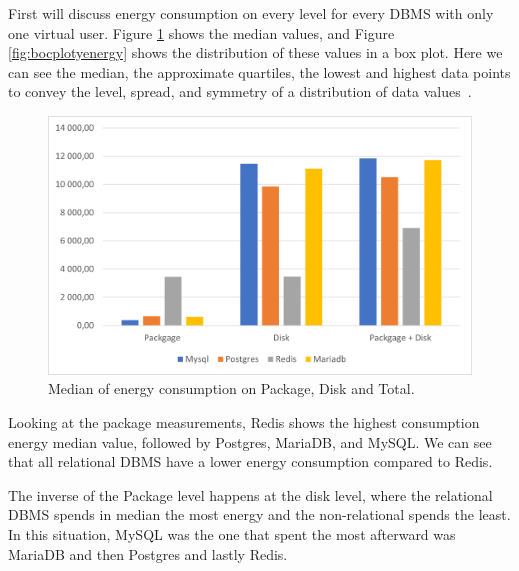 

    First will discuss energy consumption on every level for every DBMS with only one virtual user. Figure \ref{fig:medianenergy} shows the median values, and Figure \ref{fig:bocplotyenergy} shows the distribution of these values in a box plot. Here we can see the median, the approximate quartiles, the lowest and highest data points to convey the level, spread, and symmetry of a distribution of data values~\cite{doi:10.7326/0003-4819-110-11-916}.

\begin{figure}[H]
\centering
\includegraphics[width=0.8\columnwidth]{results/median/energy.png}
\caption{Median of energy consumption on Package, Disk and Total.}
\label{fig:medianenergy}
\end{figure}

     Looking at the package measurements, Redis shows the highest consumption energy median value, followed by  Postgres, MariaDB, and MySQL. We can see that all relational DBMS have a lower energy consumption compared to Redis.
	
    The inverse of the Package level happens at the disk level, where the relational DBMS spends in median the most energy and the non-relational spends the least. In this situation, MySQL was the one that spent the most afterward was MariaDB and then Postgres and lastly Redis.

